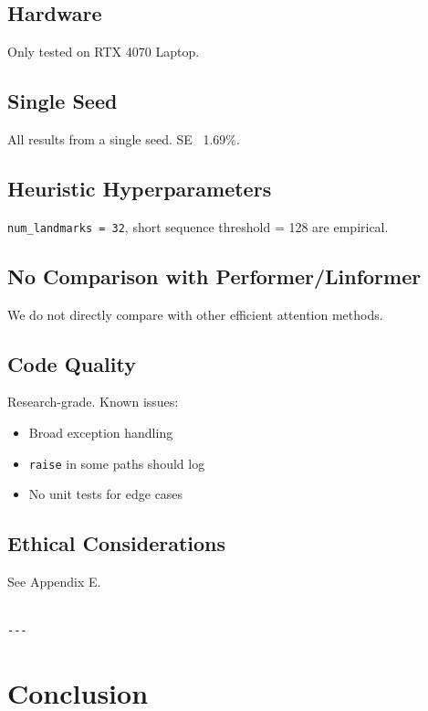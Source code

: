 \subsection{Hardware}

Only tested on RTX 4070 Laptop.

\subsection{Single Seed}

All results from a single seed. SE ~1.69\%.

\subsection{Heuristic Hyperparameters}

\texttt{num\_landmarks = 32}, short sequence threshold = 128 are empirical.

\subsection{No Comparison with Performer/Linformer}

We do not directly compare with other efficient attention methods.

\subsection{Code Quality}

Research-grade. Known issues:
\begin{itemize}
\item Broad exception handling
\item \texttt{raise} in some paths should log
\item No unit tests for edge cases

\end{itemize}
\subsection{Ethical Considerations}

See Appendix E.
\begin{lstlisting}

---
\end{lstlisting}


\section{Conclusion}

